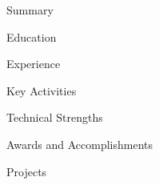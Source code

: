 \documentclass{resume}
\begin{document}

\begin{rSection}{Summary}

\end{rSection}


\begin{rSection}{Education}

\end{rSection}


\begin{rSection}{Experience}

\end{rSection}


\begin{rSection}{Key Activities}

\end{rSection}


\begin{rSection}{Technical Strengths}

\end{rSection}


\begin{rSection}{Awards and Accomplishments}

\end{rSection}


\begin{rSection}{Projects}

\end{rSection}
\end{document}

